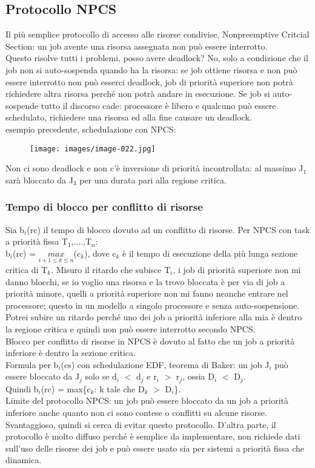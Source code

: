 \documentclass[12pt, oneside]{extbook}
\begin{document}
\subsection{Protocollo NPCS}
Il più semplice protocollo di accesso alle risorse condivise, Nonpreemptive Critcial Section: un job avente una risorsa assegnata non può essere interrotto.\\ Questo risolve tutti i problemi, posso avere deadlock? No, solo a condizione che il job non si auto-sospenda quando ha la risorsa: se job ottiene risorsa e non può essere interrotto non può esserci deadlock, job di priorità superiore non potrà richiedere altra risorsa perché non potrà andare in esecuzione. Se job si auto-sospende tutto il discorso cade: processore è libero e qualcuno può essere schedulato, richiedere una risorsa ed alla fine causare un deadlock.\\ esempio precedente,  schedulazione con NPCS:\\
\begin{figure}[!h]
\centering
\texttt{[image: images/image-022.jpg]}
\end{figure}
Non ci sono deadlock e non c'è inversione di priorità incontrollata: al massimo J$_{1}$ sarà bloccato da J$_{3}$ per una durata pari alla regione critica.
\subsubsection{Tempo di blocco per conflitto di risorse}
Sia b$_{i}$(rc) il tempo di blocco dovuto ad un conflitto di risorse. Per NPCS con task a priorità fissa T$_{1}$,....,T$_{n}$:\\
b$_{i}$(rc) = $\underset{i+1 \leq k \leq n}{max}$(c$_{k}$), dove c$_{k}$ è il tempo di esecuzione della più lunga sezione critica di T$_{k}$. Misuro il ritardo che subisce T$_{i}$, i job di priorità superiore non mi danno blocchi, se io voglio una risorsa e la trovo bloccata è per via di job a priorità minore, quelli a priorità superiore non mi fanno neanche entrare nel processore; questo in un modello a singolo processore e senza auto-sospensione.\\ Potrei subire un ritardo perché uno dei job a priorità inferiore alla mia è dentro la regione critica e quindi non può essere interrotto secondo NPCS.\\ Blocco per conflitto di risorse in NPCS è dovuto al fatto che un job a priorità inferiore è dentro la sezione critica.\\ Formula per b$_{i}$(cs) con schedulazione EDF, teorema di Baker: un job J$_{i}$ può essere bloccato da J$_{j}$ solo se d$_{i}$ $<$ d$_{j}$ e r$_{i}$ $>$ r$_{j}$, ossia D$_{i}$ $<$ D$_{j}$.\\ Quindi b$_{i}$(rc) = max\{c$_{k}$: k tale che D$_{k}$ $>$ D$_{i}$\}.\\ Limite del protocollo NPCS: un job può essere bloccato da un job a priorità inferiore anche quanto non ci sono contese o conflitti su alcune risorse. Svantaggioso, quindi si cerca di evitar questo protocollo. D'altra parte, il protocollo è molto diffuso perché è semplice da implementare, non richiede dati sull'uso delle risorse dei job e può essere usato sia per sistemi a priorità fissa che dinamica.
\end{document}
